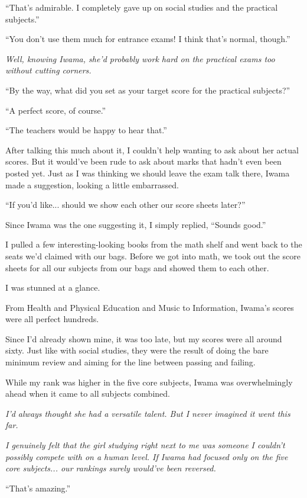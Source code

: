 \documentclass[
    a4paper,
    12pt,
    twoside,
    openany,
    UTF8,
    fontset=windows
]{ctexbook}
\begin{document}
``That's admirable. I completely gave up on social studies and the practical subjects.''

``You don't use them much for entrance exams! I think that's normal, though.''

\textit{Well, knowing Iwama, she'd probably work hard on the practical exams too without cutting corners.}

``By the way, what did you set as your target score for the practical subjects?''

``A perfect score, of course.''

``The teachers would be happy to hear that.''

After talking this much about it, I couldn't help wanting to ask about her actual scores. But it would've been rude to ask about marks that hadn't even been posted yet. Just as I was thinking we should leave the exam talk there, Iwama made a suggestion, looking a little embarrassed.

``If you'd like... should we show each other our score sheets later?''

Since Iwama was the one suggesting it, I simply replied, ``Sounds good.''

I pulled a few interesting-looking books from the math shelf and went back to the seats we'd claimed with our bags. Before we got into math, we took out the score sheets for all our subjects from our bags and showed them to each other.

I was stunned at a glance.

From Health and Physical Education and Music to Information, Iwama's scores were all perfect hundreds.

Since I'd already shown mine, it was too late, but my scores were all around sixty. Just like with social studies, they were the result of doing the bare minimum review and aiming for the line between passing and failing.

While my rank was higher in the five core subjects, Iwama was overwhelmingly ahead when it came to all subjects combined.

\textit{I'd always thought she had a versatile talent. But I never imagined it went this far.}

\textit{I genuinely felt that the girl studying right next to me was someone I couldn't possibly compete with on a human level. If Iwama had focused only on the five core subjects... our rankings surely would've been reversed.}

``That's amazing.''
\end{document}
